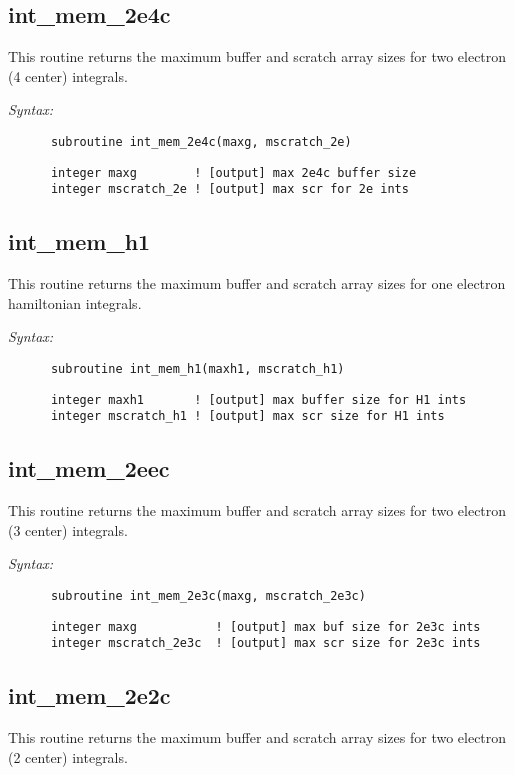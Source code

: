 \subsection{int\_mem\_2e4c} 
This routine returns the maximum buffer and scratch array 
sizes for two electron (4 center) 
integrals. 
 
{\it Syntax:} 
\begin{verbatim} 
      subroutine int_mem_2e4c(maxg, mscratch_2e) 
\end{verbatim} 
\begin{verbatim} 
      integer maxg        ! [output] max 2e4c buffer size 
      integer mscratch_2e ! [output] max scr for 2e ints 
\end{verbatim} 
\subsection{int\_mem\_h1} 
This routine returns the maximum buffer and scratch array 
sizes for one electron hamiltonian  
integrals. 
 
{\it Syntax:} 
\begin{verbatim} 
      subroutine int_mem_h1(maxh1, mscratch_h1) 
\end{verbatim} 
\begin{verbatim} 
      integer maxh1       ! [output] max buffer size for H1 ints 
      integer mscratch_h1 ! [output] max scr size for H1 ints 
\end{verbatim} 
\subsection{int\_mem\_2eec} 
This routine returns the maximum buffer and scratch array 
sizes for two electron (3 center) 
integrals. 
 
{\it Syntax:} 
\begin{verbatim} 
      subroutine int_mem_2e3c(maxg, mscratch_2e3c) 
\end{verbatim} 
\begin{verbatim} 
      integer maxg           ! [output] max buf size for 2e3c ints 
      integer mscratch_2e3c  ! [output] max scr size for 2e3c ints 
\end{verbatim} 
\subsection{int\_mem\_2e2c} 
This routine returns the maximum buffer and scratch array 
sizes for two electron (2 center) 
integrals. 
 
